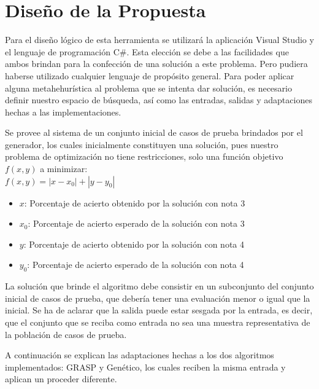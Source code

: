 \documentclass[a4paper,12pt]{book}
\begin{document}
		
		
\chapter{Diseño de la Propuesta}

	Para el diseño lógico de esta herramienta se utilizará la aplicación Visual Studio y el lenguaje de programación C\#. Esta elección se debe a las facilidades que ambos brindan para la confección de una solución a este problema. Pero pudiera haberse utilizado cualquier lenguaje de propósito general. 
	Para poder aplicar alguna metahehurística al problema que se intenta dar solución, es necesario definir nuestro espacio de búsqueda, así como las entradas, salidas y adaptaciones hechas a las implementaciones.
	
	Se provee al sistema de un conjunto inicial de casos de prueba brindados por el generador, los cuales inicialmente constituyen una solución, pues nuestro problema de optimización no tiene restricciones, solo una función objetivo $f(x,y)$ a minimizar: \\
	
	$f(x,y) = |x - x_0| + |y - y_0|$ \label{fo}
	
	\begin{itemize}
		\item $x$: Porcentaje de acierto obtenido por la solución con nota 3
		\item $x_0$: Porcentaje de acierto esperado de la solución con nota 3
		\item $y$: Porcentaje de acierto obtenido por la solución con nota 4
		\item $y_0$: Porcentaje de acierto esperado de la solución con nota 4
	\end{itemize}

	La solución que brinde el algoritmo debe consistir en un subconjunto del conjunto inicial de casos de prueba, que debería tener una evaluación menor o igual que la inicial. Se ha de aclarar que la salida puede estar sesgada por la entrada, es decir, que el conjunto que se reciba como entrada no sea una muestra representativa de la población de casos de prueba.
	
	A continuación se explican las adaptaciones hechas a los dos algoritmos implementados: GRASP y Genético, los cuales reciben la misma entrada y aplican un proceder diferente.
	
\end{document}
